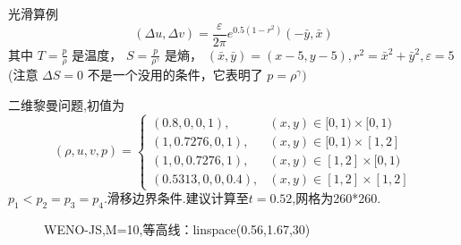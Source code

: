 \documentclass{book}
\begin{document}
\begin{example}
\begin{example}{}{}
\begin{example}
\begin{example}
\begin{example}
\begin{example}
\begin{example}{}{}
\begin{example}
\begin{example}{光滑算例}{}
\begin{equation}
    \end{equation}
    \begin{equation}
        (\Delta u, \Delta v)=\frac{\varepsilon}{2 \pi} e^{0.5\left(1-r^{2}\right)}(-\bar{y}, \bar{x})
    \end{equation}
    其中  $T=\frac{p}{\rho}$  是温度，  $S=\frac{p}{\rho^{\gamma}}$  是熵，  $(\bar{x}, \bar{y})=(x-5, y-5) , r^{2}=\bar{x}^{2}+\bar{y}^{2}, \varepsilon=5 $
    (注意 $\Delta S=0$ 不是一个没用的条件，它表明了 $ p=\rho^{\gamma}  )$
\end{example}

\begin{example}{}{}
    二维黎曼问题\cite{RN13},初值为
    \begin{equation}
        (\rho, u, v, p)=\begin{cases}
            (0.8,0,0,1),      & (x, y) \in[0,1) \times[0,1) \\
            (1,0.7276,0,1),   & (x, y) \in[0,1) \times[1,2] \\
            (1,0,0.7276,1),   & (x, y) \in[1,2] \times[0,1) \\
            (0.5313,0,0,0.4), & (x, y) \in[1,2] \times[1,2]
        \end{cases}
    \end{equation}
    $p_1<p_2=p_3=p_4$.滑移边界条件.建议计算至$t=0.52$,网格为260*260.

    \begin{figure}[H]%
        \centering
        \quad
        \caption{WENO-JS,M=10,等高线：linspace(0.56,1.67,30)}
    \end{figure}



\end{example}
\end{example}
\end{example}
\end{example}
\end{example}
\end{example}
\end{example}
\end{example}
\end{example}
\end{document}
